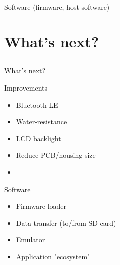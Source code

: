 \documentclass[compress,red]{beamer}
\begin{document}
\begin{frame}{Software (firmware, host software)}

  \begin{center}
  \end{center}

  \note[item]{}

\end{frame}


\section{What's next?}

\subsection*{} %

\begin{frame}{What's next?}

  \begin{block}{Improvements}
    \begin{itemize}
    \item Bluetooth LE
    \item Water-resistance
    \item LCD backlight
    \item Reduce PCB/housing size
    \item 
    \end{itemize}
  \end{block}

  \begin{block}{Software}
    \begin{itemize}
    \item Firmware loader
    \item Data transfer (to/from SD card)
    \item Emulator
    \item Application "ecosystem"
    \end{itemize}
  \end{block}

  \note[item]{}

\end{frame}
\end{document}
